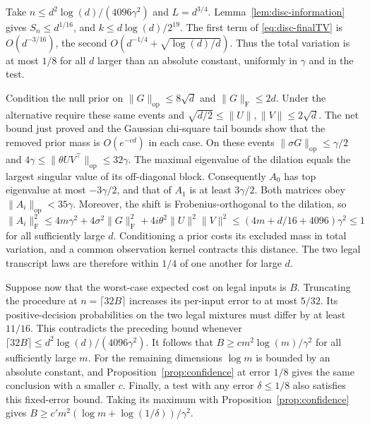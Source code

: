 Take \(n\le d^2\log(d)/(4096\gamma^2)\) and \(L=d^{3/4}\).
Lemma~\ref{lem:disc-information} gives \(S_n\le d^{1/16}\), and
\(k\le d\log(d)/2^{19}\). The first term of \eqref{eq:disc-finalTV}
is \(O(d^{-3/16})\), the second \(O(d^{-1/4}+\sqrt{\log(d)/d})\).
Thus the total variation is at most \(1/8\) for all \(d\) larger than
an absolute constant, uniformly in \(\gamma\) and in the test.

Condition the null prior on \(\|G\|_{\mathrm{op}}\le8\sqrt d\) and
\(\|G\|_{\mathrm F}\le2d\). Under the alternative require these same events
and \(\sqrt{d/2}\le\|U\|,\|V\|\le2\sqrt d\).
The net bound just proved and the Gaussian chi-square tail bounds show
that the removed prior mass is \(O(e^{-c d})\) in each case.
On these events \(\|\sigma G\|_{\mathrm{op}}\le\gamma/2\) and
\(4\gamma\le\|\theta UV^\top\|_{\mathrm{op}}\le32\gamma\).
The maximal eigenvalue of the dilation equals the largest singular
value of its off-diagonal block. Consequently \(A_0\) has top
eigenvalue at most \(-3\gamma/2\), and that of \(A_1\) is at least
\(3\gamma/2\). Both matrices obey \(\|A_i\|_{\mathrm{op}}<35\gamma\).
Moreover, the shift is Frobenius-orthogonal to the dilation, so
\[
 \|A_i\|_{\mathrm F}^2
 \le 4m\gamma^2+4\sigma^2\|G\|_{\mathrm F}^2
                  +4i\theta^2\|U\|^2\|V\|^2
 \le (4m+d/16+4096)\gamma^2\le1
\]
for all sufficiently large \(d\).
Conditioning a prior costs its excluded mass in total variation, and
a common observation kernel contracts this distance. The two legal
transcript laws are therefore within \(1/4\) of one another for large \(d\).

Suppose now that the worst-case expected cost on legal inputs is \(B\).
Truncating the procedure at \(n=\lceil32B\rceil\) increases its
per-input error to at most \(5/32\). Its positive-decision probabilities
on the two legal mixtures must differ by at least \(11/16\). This
contradicts the preceding bound whenever
\(\lceil32B\rceil\le d^2\log(d)/(4096\gamma^2)\).
It follows that \(B\ge c m^2\log(m)/\gamma^2\) for all sufficiently
large \(m\). For the remaining dimensions \(\log m\) is bounded by an
absolute constant, and Proposition~\ref{prop:confidence} at error
\(1/8\) gives the same conclusion with a smaller \(c\).
Finally, a test with any error \(\delta\le1/8\) also satisfies this
fixed-error bound. Taking its maximum with Proposition~\ref{prop:confidence}
gives \(B\ge c' m^2(\log m+\log(1/\delta))/\gamma^2\).

